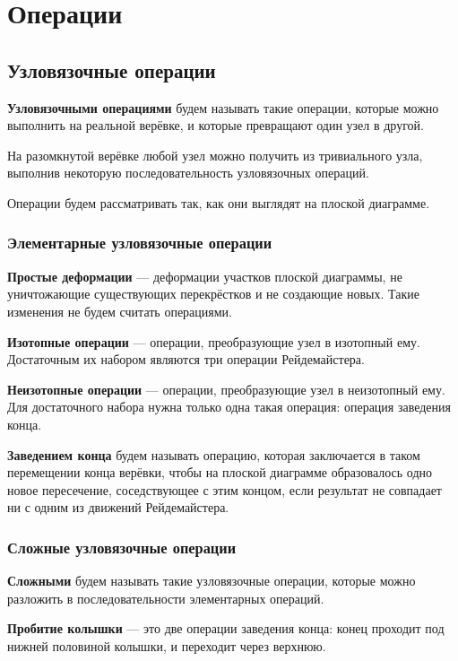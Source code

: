 \section{Операции}

\subsection{Узловязочные операции}

\textbf{Узловязочными операциями} будем называть такие операции, которые можно выполнить на реальной верёвке, и которые превращают один узел в другой.

На разомкнутой верёвке любой узел можно получить из тривиального узла, выполнив некоторую последовательность узловязочных операций.

Операции будем рассматривать так, как они выглядят на плоской диаграмме.

\subsubsection{Элементарные узловязочные операции}

\textbf{Простые деформации}  --- деформации участков плоской диаграммы, не уничтожающие существующих перекрёстков и не создающие новых. Такие изменения не будем считать операциями.

\textbf{Изотопные операции}  --- операции, преобразующие узел в изотопный ему. Достаточным их набором являются три операции Рейдемайстера.

\textbf{Неизотопные операции}  --- операции, преобразующие узел в неизотопный ему. Для достаточного набора нужна только одна такая операция: операция заведения конца.

\textbf{Заведением конца}  будем называть операцию, которая заключается в таком перемещении конца верёвки, чтобы на плоской диаграмме образовалось одно новое пересечение, соседствующее с этим концом, если результат не совпадает ни с одним из движений Рейдемайстера.

\subsubsection{Сложные узловязочные операции}

\textbf{Сложными} будем называть такие узловязочные операции, которые можно разложить в последовательности элементарных операций.

\textbf{Пробитие колышки} --- это две операции заведения конца: конец проходит под нижней половиной колышки, и переходит через верхнюю.

